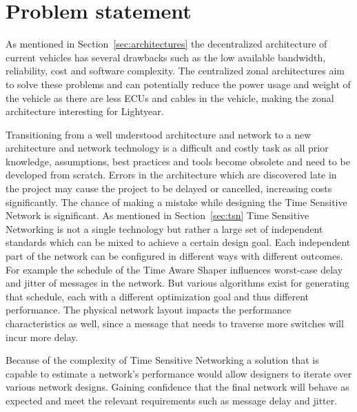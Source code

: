 \section{Problem statement}
\label{sec:problem_statement}
As mentioned in Section~\ref{sec:architectures} the decentralized architecture of current vehicles has several drawbacks such as the low available bandwidth, reliability, cost and software complexity. The centralized zonal architectures aim to solve these problems and can potentially reduce the power usage and weight of the vehicle as there are less ECUs and cables in the vehicle, making the zonal architecture interesting for Lightyear.

Transitioning from a well understood architecture and network to a new architecture and network technology is a difficult and costly task as all prior knowledge, assumptions, best practices and tools become obsolete and need to be developed from scratch. Errors in the architecture which are discovered late in the project may cause the project to be delayed or cancelled, increasing costs significantly. The chance of making a mistake while designing the Time Sensitive Network is significant. As mentioned in Section~\ref{sec:tsn} Time Sensitive Networking is not a single technology but rather a large set of independent standards which can be mixed to achieve a certain design goal. Each independent part of the network can be configured in different ways with different outcomes. For example the schedule of the Time Aware Shaper influences worst-case delay and jitter of messages in the network. But various algorithms exist for generating that schedule, each with a different optimization goal and thus different performance. The physical network layout impacts the performance characteristics as well, since a message that needs to traverse more switches will incur more delay.

Because of the complexity of Time Sensitive Networking a solution that is capable to estimate a network's performance would allow designers to iterate over various network designs. Gaining confidence that the final network will behave as expected and meet the relevant requirements such as message delay and jitter.